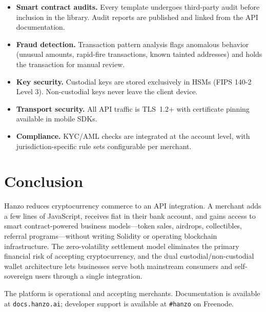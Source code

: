 \documentclass[11pt,letterpaper]{article}
\begin{document}
\begin{itemize}[leftmargin=1.1em]
    \item \textbf{Smart contract audits.}  Every template undergoes
    third-party audit before inclusion in the library.  Audit reports are
    published and linked from the API documentation.
    \item \textbf{Fraud detection.}  Transaction pattern analysis flags
    anomalous behavior (unusual amounts, rapid-fire transactions, known
    tainted addresses) and holds the transaction for manual review.
    \item \textbf{Key security.}  Custodial keys are stored exclusively in
    HSMs (FIPS 140-2 Level 3).  Non-custodial keys never leave the client
    device.
    \item \textbf{Transport security.}  All API traffic is TLS~1.2+ with
    certificate pinning available in mobile SDKs.
    \item \textbf{Compliance.}  KYC/AML checks are integrated at the
    account level, with jurisdiction-specific rule sets configurable per
    merchant.
\end{itemize}

\section{Conclusion}
\label{sec:conclusion}

Hanzo reduces cryptocurrency commerce to an API integration.  A merchant adds
a few lines of JavaScript, receives fiat in their bank account, and gains
access to smart contract-powered business models---token sales, airdrops,
collectibles, referral programs---without writing Solidity or operating
blockchain infrastructure.  The zero-volatility settlement model eliminates
the primary financial risk of accepting cryptocurrency, and the dual
custodial/non-custodial wallet architecture lets businesses serve both
mainstream consumers and self-sovereign users through a single integration.

The platform is operational and accepting merchants.  Documentation is
available at \texttt{docs.hanzo.ai}; developer support is available at
\texttt{\#hanzo} on Freenode.
\end{document}
